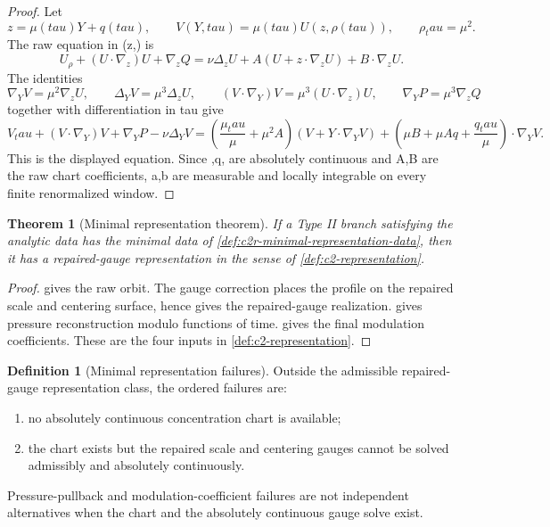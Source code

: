 \documentclass[11pt]{amsart}
\def\({}%
\def\){}%
\def\tau{tau}%
\theoremstyle{plain}
\newtheorem{theorem}{Theorem}[section]
\theoremstyle{definition}
\newtheorem{definition}[definition]{Definition}
\theoremstyle{remark}
\begin{document}
\begin{proof}
Let
\[
  z=\mu(\tau)Y+q(\tau),\qquad
  V(Y,\tau)=\mu(\tau)U(z,\rho(\tau)),\qquad
  \rho_\tau=\mu^2.
\]
The raw equation in \((z,\rho)\) is
\[
  U_\rho+(U\cdot\nabla_z)U+\nabla_zQ
  =
  \nu\Delta_zU+A(U+z\cdot\nabla_zU)+B\cdot\nabla_zU.
\]
The identities
\[
  \nabla_YV=\mu^2\nabla_zU,\qquad
  \Delta_YV=\mu^3\Delta_zU,\qquad
  (V\cdot\nabla_Y)V=\mu^3(U\cdot\nabla_z)U,\qquad
  \nabla_YP=\mu^3\nabla_zQ
\]
together with differentiation in \(\tau\) give
\[
  V_\tau+(V\cdot\nabla_Y)V+\nabla_YP-\nu\Delta_YV
  =
  \left(\frac{\mu_\tau}{\mu}+\mu^2A\right)(V+Y\cdot\nabla_YV)
  +
  \left(\mu B+\mu Aq+\frac{q_\tau}{\mu}\right)\cdot\nabla_YV.
\]
This is the displayed equation.  Since \(\mu,q,\rho\) are absolutely continuous
and \(A,B\) are the raw chart coefficients, \(a,b\) are measurable and locally
integrable on every finite renormalized window.
\end{proof}

\begin{theorem}[Minimal representation theorem]
\label{thm:c2r-minimal-representation}
If a Type II branch satisfying the analytic data has the minimal data of
\cref{def:c2r-minimal-representation-data}, then it has a repaired-gauge
representation in the sense of \cref{def:c2-representation}.
\end{theorem}

\begin{proof}
 gives the raw orbit.  The gauge correction
places the profile on the repaired scale and centering surface, hence gives the
repaired-gauge realization.   gives pressure
reconstruction modulo functions of time.  
gives the final modulation coefficients.  These are the four inputs in
\cref{def:c2-representation}.
\end{proof}

\begin{definition}[Minimal representation failures]
\label{def:c2r-minimal-failures}
Outside the admissible repaired-gauge representation class, the ordered failures
are:
\begin{enumerate}[label=\textup{(\roman*)}]
\item no absolutely continuous concentration chart is available;
\item the chart exists but the repaired scale and centering gauges cannot be
solved admissibly and absolutely continuously.
\end{enumerate}
Pressure-pullback and modulation-coefficient failures are not independent
alternatives when the chart and the absolutely continuous gauge solve exist.
\end{definition}
\end{document}
